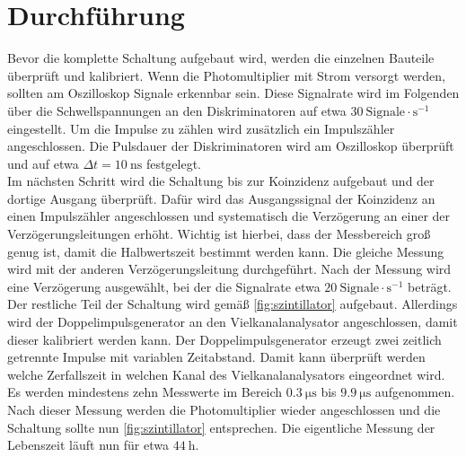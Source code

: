 \section{Durchführung}
\label{sec:Durchführung}

Bevor die komplette Schaltung aufgebaut wird, werden die einzelnen Bauteile überprüft und kalibriert.
Wenn die Photomultiplier mit Strom versorgt werden, sollten am Oszilloskop Signale erkennbar sein.
Diese Signalrate wird im Folgenden über die Schwellspannungen an den Diskriminatoren auf etwa $\qty{30}{\text{Signale}\cdot \second^{-1}}$ eingestellt.
Um die Impulse zu zählen wird zusätzlich ein Impulszähler angeschlossen.
Die Pulsdauer der Diskriminatoren wird am Oszilloskop überprüft und auf etwa $\Delta t = \qty{10}{\nano\second}$ festgelegt.
\\
Im nächsten Schritt wird die Schaltung bis zur Koinzidenz aufgebaut und der dortige Ausgang überprüft.
Dafür wird das Ausgangssignal der Koinzidenz an einen Impulszähler angeschlossen und systematisch die Verzögerung an einer der Verzögerungsleitungen erhöht.
Wichtig ist hierbei, dass der Messbereich groß genug ist, damit die Halbwertszeit bestimmt werden kann.
Die gleiche Messung wird mit der anderen Verzögerungsleitung durchgeführt.
Nach der Messung wird eine Verzögerung ausgewählt, bei der die Signalrate etwa $\qty{20}{\text{Signale}\cdot \second^{-1}}$ beträgt.
\\
Der restliche Teil der Schaltung wird gemäß \autoref{fig:szintillator} aufgebaut.
Allerdings wird der Doppelimpulsgenerator an den Vielkanalanalysator angeschlossen, damit dieser kalibriert werden kann.
Der Doppelimpulsgenerator erzeugt zwei zeitlich getrennte Impulse mit variablen Zeitabstand.
Damit kann überprüft werden welche Zerfallszeit in welchen Kanal des Vielkanalanalysators eingeordnet wird.
Es werden mindestens zehn Messwerte im Bereich $\qty{0.3}{\micro\second}$ bis $\qty{9.9}{\micro\second}$ aufgenommen.
Nach dieser Messung werden die Photomultiplier wieder angeschlossen und die Schaltung sollte nun \autoref{fig:szintillator} entsprechen.
Die eigentliche Messung der Lebenszeit läuft nun für etwa $\qty{44}{\hour}$.